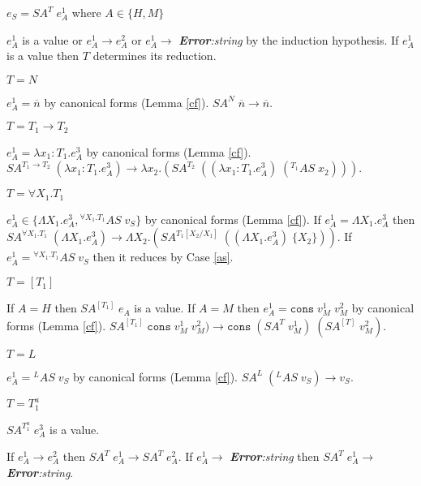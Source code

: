 \begin{case}
$e_{S}=SA^{T}\;e_{A}^{1}$ where $A\in\lbrace H,M\rbrace$

$e_{A}^{1}$ is a value or $e_{A}^{1}\rightarrow e_{A}^{2}$ or $e_{A}^{1}\rightarrow$ \emph{\textbf{Error}:\;string} by the induction hypothesis.  If $e_{A}^{1}$ is a value then $T$ determines its reduction.
\begin{subcase}
$T=N$

$e_{A}^{1}=\overline{n}$ by canonical forms (Lemma \ref{cf}).  $SA^{N}\;\overline{n}\rightarrow\overline{n}$.
\end{subcase}
\begin{subcase}
$T=T_{1}\rightarrow T_{2}$

$e_{A}^{1}=\lambda x_{1}:T_{1}.e_{A}^{3}$ by canonical forms (Lemma \ref{cf}).  $SA^{T_{1}\rightarrow T_{2}}\;(\lambda x_{1}:T_{1}.e_{A}^{3})\rightarrow\lambda x_{2}.(SA^{T_{2}}\;((\lambda x_{1}:T_{1}.e_{A}^{3})\;(^{T_{1}}AS\;x_{2})))$.
\end{subcase}
\begin{subcase}
$T=\forall X_{1}.T_{1}$

$e_{A}^{1}\in\lbrace\Lambda X_{1}.e_{A}^{3},{^{\forall X_{1}.T_{1}}A}S\;v_{S}\rbrace$ by canonical forms (Lemma \ref{cf}).  If $e_{A}^{1}=\Lambda X_{1}.e_{A}^{3}$ then $SA^{\forall X_{1}.T_{1}}\;(\Lambda X_{1}.e_{A}^{3})\rightarrow\Lambda X_{2}.(SA^{T_{1}[X_{2}/X_{1}]}\;((\Lambda X_{1}.e_{A}^{3})\;\lbrace X_{2}\rbrace))$.  If $e_{A}^{1}={^{\forall X_{1}.T_{1}}A}S\;v_{S}$ then it reduces by Case \ref{as}.
\end{subcase}
\begin{subcase}
$T=[T_{1}]$

If $A=H$ then $SA^{[T_{1}]}\;e_{A}$ is a value.  If $A=M$ then $e_{A}^{1}=\mathtt{cons}\;v_{M}^{1}\;v_{M}^{2}$ by canonical forms (Lemma \ref{cf}).  $SA^{[T_{1}]}\;\mathtt{cons}\;v_{M}^{1}\;v_{M}^{2})\rightarrow\mathtt{cons}\;(SA^{T}\;v_{M}^{1})\;(SA^{[T]}\;v_{M}^{2})$.
\end{subcase}
\begin{subcase}
$T=L$

$e_{A}^{1}={^{L}A}S\;v_{S}$ by canonical forms (Lemma \ref{cf}).  $SA^{L}\;(^{L}AS\;v_{S})\rightarrow v_{S}$.
\end{subcase}
\begin{subcase}
$T=T_{1}^{a}$

$SA^{T_{1}^{a}}\;e_{A}^{3}$ is a value.
\end{subcase}
If $e_{A}^{1}\rightarrow e_{A}^{2}$ then $SA^{T}\;e_{A}^{1}\rightarrow SA^{T}\;e_{A}^{2}$.  If $e_{A}^{1}\rightarrow$ \emph{\textbf{Error}:\;string} then $SA^{T}\;e_{A}^{1}\rightarrow$ \emph{\textbf{Error}:\;string}.
\end{case}